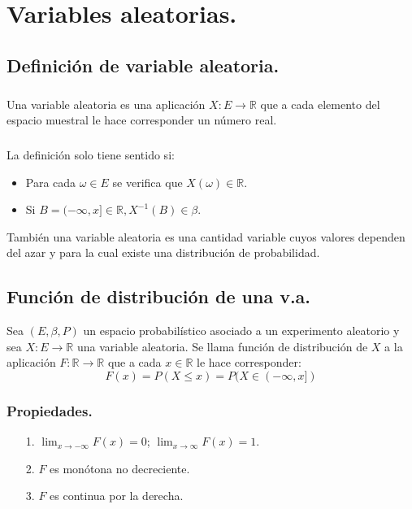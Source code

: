 \chapter{Variables aleatorias.}
\section{Definición de variable aleatoria.}
\paragraph{}
Una variable aleatoria es una aplicación $X:E\rightarrow\mathbb{R}$ que a cada elemento del espacio muestral le hace corresponder un número real.

\paragraph{}
La definición solo tiene sentido si:
\begin{itemize}
\item Para cada $\omega \in E$ se verifica que $X(\omega)\in\mathbb{R}$.
\item Si $B=(-\infty,x]\in\mathbb{R}, X^{-1}(B)\in\beta$.
\end{itemize}

También una variable aleatoria es una cantidad variable cuyos valores dependen del azar y para la cual existe una distribución de probabilidad.


\section{Función de distribución de una v.a.}
Sea $(E,\beta,P)$ un espacio probabilístico asociado a un experimento aleatorio y sea $X:E\rightarrow\mathbb{R}$ una variable aleatoria. Se llama función de distribución de $X$ a la aplicación $F:\mathbb{R}\rightarrow\mathbb{R}$ que a cada $x\in\mathbb{R}$ le hace corresponder:
\[F(x)=P(X \leq x)=P(X\in(-\infty,x])\]

\subsection{Propiedades.}
\begin{itemize}
\item[1.]$\lim_{x \to -\infty} F(x)=0$; $\lim_{x \to \infty} F(x)=1$.
\item[2.]$F$ es monótona no decreciente.
\item[3.]$F$ es continua por la derecha.
\end{itemize}

